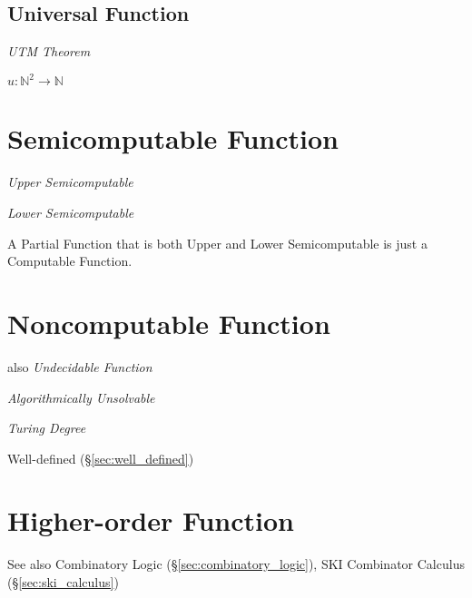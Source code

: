 \subsection{Universal Function}\label{sec:universal_function}

\emph{UTM Theorem}

$u : \mathbb{N}^2 \rightarrow \mathbb{N}$



\section{Semicomputable Function}\label{sec:semicomputable_function}

\emph{Upper Semicomputable}

\emph{Lower Semicomputable}

A Partial Function that is both Upper and Lower Semicomputable is just
a Computable Function.



\section{Noncomputable Function}\label{sec:noncomputable_function}

also \emph{Undecidable Function}

\emph{Algorithmically Unsolvable}

\emph{Turing Degree}

Well-defined (\S\ref{sec:well_defined})



\section{Higher-order Function}\label{sec:higherorder_function}

\fist See also Combinatory Logic (\S\ref{sec:combinatory_logic}), SKI
Combinator Calculus (\S\ref{sec:ski_calculus})



